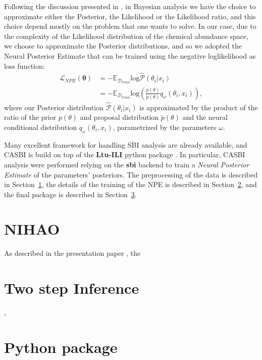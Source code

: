Following the discussion presented in \cite{hoLtUILIAllinOneFramework2024}, in Bayesian analysis we have the choice to approximate either the Posterior, the Likelihood or the Likelihood ratio, and this choice depend mostly on the problem that one wants to solve. In our case, due to the complexity of the Likelihood distribution of the chemical abundance space, we choose to approximate the Posterior distributions, and so we adopted the Neural Posterior Estimate that can be trained using the negative loglikelihood as loss function:
\begin{equation}
\begin{aligned}
    \mathcal{L}_{NPE}(\boldsymbol{\theta}) &= - \mathbb{E}_{\mathcal{D}_{train}} \text{log} \hat{\mathcal{P}}(\theta_i | x_i) \\ 
    &= - \mathbb{E}_{\mathcal{D}_{train}} \text{log} \left( \frac{p(\theta)}{\tilde{p}(\theta)} q_{\omega}(\theta_i, x_i) \right), 
\end{aligned}
\end{equation}
where our Posterior distribution $ \hat{\mathcal{P}}(\theta_i | x_i)$ is approximated by the product of the ratio of the prior $p(\theta)$ and proposal distribution $\tilde{p}(\theta)$ and the neural conditional distribution $q_{\omega}(\theta_i, x_i)$, parametrized by the parameters $\omega$. 

Many excellent framework for handling SBI analysis are already available, and CASBI is build on top of the \textbf{Ltu-ILI} python package \cite{hoLtUILIAllinOneFramework2024}. In particular, CASBI analysis were performed relying on the \textbf{sbi} backend \cite{tejero-canteroSbiToolkitSimulationbased2020} to train a \textit{Neural Posterior Estimate} of the parameters' posteriors. The preprocessing of the data is described in Section~\ref{sec:NIHAO}, the details of the training of the NPE is described in Section~\ref{sec:Two step Inference}, and the final package is described in Section~\ref{sec:Python package}.


\section{NIHAO}\label{sec:NIHAO}
As described in the presentation paper \cite{wangNIHAOProjectReproducing2015}, the 

\section{Two step Inference}\label{sec:Two step Inference},

\section{Python package}\label{sec:Python package}